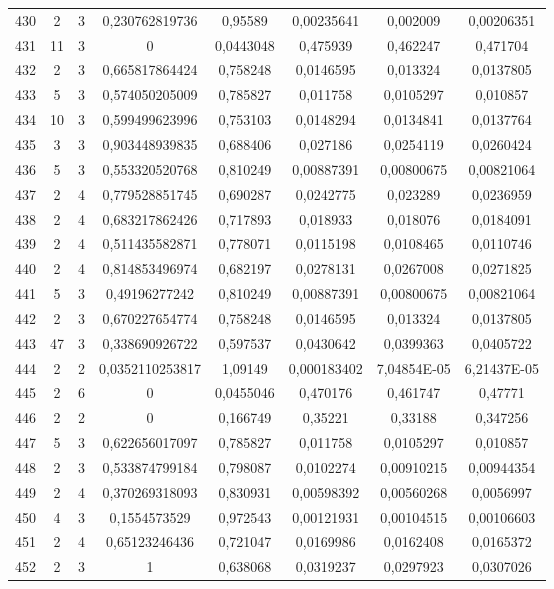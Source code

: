 \begin{longtable}{|c|c|c|c|c|c|c|c|}
430 & 2 & 3 & 0,230762819736 & 0,95589 & 0,00235641 & 0,002009 & 0,00206351  \\
431 & 11 & 3 & 0 & 0,0443048 & 0,475939 & 0,462247 & 0,471704  \\
432 & 2 & 3 & 0,665817864424 & 0,758248 & 0,0146595 & 0,013324 & 0,0137805  \\
433 & 5 & 3 & 0,574050205009 & 0,785827 & 0,011758 & 0,0105297 & 0,010857  \\
434 & 10 & 3 & 0,599499623996 & 0,753103 & 0,0148294 & 0,0134841 & 0,0137764  \\
435 & 3 & 3 & 0,903448939835 & 0,688406 & 0,027186 & 0,0254119 & 0,0260424  \\
436 & 5 & 3 & 0,553320520768 & 0,810249 & 0,00887391 & 0,00800675 & 0,00821064  \\
437 & 2 & 4 & 0,779528851745 & 0,690287 & 0,0242775 & 0,023289 & 0,0236959  \\
438 & 2 & 4 & 0,683217862426 & 0,717893 & 0,018933 & 0,018076 & 0,0184091  \\
439 & 2 & 4 & 0,511435582871 & 0,778071 & 0,0115198 & 0,0108465 & 0,0110746  \\
440 & 2 & 4 & 0,814853496974 & 0,682197 & 0,0278131 & 0,0267008 & 0,0271825  \\
441 & 5 & 3 & 0,49196277242 & 0,810249 & 0,00887391 & 0,00800675 & 0,00821064  \\
442 & 2 & 3 & 0,670227654774 & 0,758248 & 0,0146595 & 0,013324 & 0,0137805  \\
443 & 47 & 3 & 0,338690926722 & 0,597537 & 0,0430642 & 0,0399363 & 0,0405722  \\
444 & 2 & 2 & 0,0352110253817 & 1,09149 & 0,000183402 & 7,04854E-05 & 6,21437E-05  \\
445 & 2 & 6 & 0 & 0,0455046 & 0,470176 & 0,461747 & 0,47771  \\
446 & 2 & 2 & 0 & 0,166749 & 0,35221 & 0,33188 & 0,347256  \\
447 & 5 & 3 & 0,622656017097 & 0,785827 & 0,011758 & 0,0105297 & 0,010857  \\
448 & 2 & 3 & 0,533874799184 & 0,798087 & 0,0102274 & 0,00910215 & 0,00944354  \\
449 & 2 & 4 & 0,370269318093 & 0,830931 & 0,00598392 & 0,00560268 & 0,0056997  \\
450 & 4 & 3 & 0,1554573529 & 0,972543 & 0,00121931 & 0,00104515 & 0,00106603  \\
451 & 2 & 4 & 0,65123246436 & 0,721047 & 0,0169986 & 0,0162408 & 0,0165372  \\
452 & 2 & 3 & 1 & 0,638068 & 0,0319237 & 0,0297923 & 0,0307026  \\

\end{longtable}
